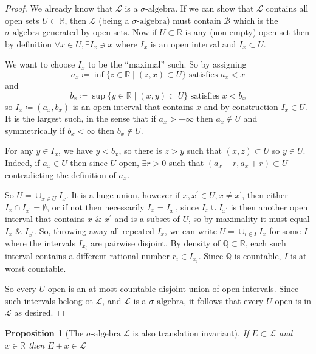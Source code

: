 \documentclass[11pt]{article}
\newtheorem*{prop}{Proposition}
\newcommand{\siga}{\sigma\text{-algebra}}
\newcommand{\pr}{^{\prime}}
\begin{document}
    \begin{proof}
        We already know that $\mathcal{L}$ is a $\siga$.
        If we can show that $\mathcal{L}$ contains all open sets $U \subset \mathbb{R}$, then $\mathcal{L}$ (being a $\siga$) must contain $\mathcal{B}$ which is the $\siga$ generated by open sets.
        Now if $U \subset \mathbb{R}$ is any (non empty) open set then by definition $\forall x \in U, \exists I_x \ni x $ where $I_x$ is an open interval and $I_x \subset U$.

        We want to choose $I_x$ to be the ``maximal'' such.
        So by assigning
        \[
            a_x \coloneqq \inf \{z \in \mathbb{R} \mid (z,x) \subset U \} \text{ satisfies } a_x < x
        \]
        and
        \[
            b_x \coloneqq \sup \{y \in \mathbb{R} \mid (x,y) \subset U \} \text{ satisfies } x < b_x
        \]
        so $I_x \coloneqq (a_x,b_x)$ is an open interval that contains $x$ and by construction $I_x \in U$.
        It is the largest such, in the sense that if $a_x > - \infty$ then $a_x \notin U$ and symmetrically if $b_x < \infty$ then $b_x \notin U$.

        For any $y \in I_x$, we have $y<b_x$, so there is $z > y$ such that $(x,z) \subset U$ so $y \in U$.
        Indeed, if $a_x \in U$ then since $U$ open, $\exists r > 0$ such that $(a_x - r, a_x +r) \subset U$ contradicting the definition of $a_x$.

        So $U = \cup_{x \in U} I_x$.
        It is a huge union, however if $x, x\pr \in U, x \neq x\pr$, then either $I_x \cap I_{x\pr} = \emptyset$, or if not then necessarily $I_x = I_{x\pr}$, since $I_x \cup I_{x\pr}$ is then another open interval that contains $x$ \& $x\pr$ and is a subset of $U$, so by maximality it must equal $I_x$ \& $I_{x\pr}$.
        So, throwing away all repeated $I_x$, we can write $U = \cup_{i \in I} I_x$ for some $I$ where the intervals $I_{x_i}$ are pairwise disjoint.
        By density of $\mathbb{Q} \subset \mathbb{R}$, each such interval contains a different rational number $r_i \in I_{x_i}$.
        Since $\mathbb{Q}$ is countable, $I$ is at worst countable.

        So every $U$ open is an at most countable disjoint union of open intervals.
        Since such intervals belong ot $\mathcal{L}$, and $\mathcal{L}$ is a $\siga$, it follows that every $U$ open is in $\mathcal{L}$ as desired.
    \end{proof}

    \begin{prop}[The $\siga \; \mathcal{L}$ is also translation invariant]
        If $E \subset \mathcal{L}$ and $x \in \mathbb{R}$ then $E + x \in \mathcal{L}$
    \end{prop}
\end{document}
